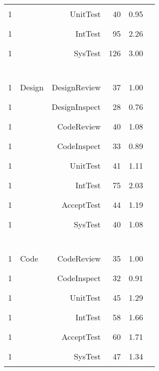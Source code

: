 \begin{tabular}{c|lr|r|rl}
1 &          &   UnitTest          & 40 &   0.95 & \textcolor{black}{\rule{9mm}{2mm}}\\
1 &          &   IntTest          & 95 &      2.26 & \textcolor{black}{\rule{22mm}{2mm}}\\
1 &          &   SysTest          & 126 &    3.00 & \textcolor{black}{\rule{30mm}{2mm}}\\
\hline\multicolumn{6}{c}{~}  \\
1 & Design   &   DesignReview     & 37 &   1.00 & \textcolor{black}{\rule{10mm}{2mm}}\\
1 &          &   DesignInspect    & 28 &    0.76 & \textcolor{black}{\rule{7mm}{2mm}}\\
1 &   &   CodeReview        & 40 &     1.08 & \textcolor{black}{\rule{10mm}{2mm}}\\
1 &   &   CodeInspect      & 33 &     0.89 & \textcolor{black}{\rule{8mm}{2mm}}\\
1 &   &   UnitTest          & 41 &     1.11 & \textcolor{black}{\rule{12mm}{2mm}}\\
1 &   &   IntTest          & 75 &    2.03 & \textcolor{black}{\rule{20mm}{2mm}}\\
1 &   &   AcceptTest       & 44 &     1.19 & \textcolor{black}{\rule{12mm}{2mm}}\\
1 &   &   SysTest           & 40 &     1.08 & \textcolor{black}{\rule{10mm}{2mm}}\\
\hline\multicolumn{6}{c}{~}  \\
1 &  Code   &   CodeReview      & 35    & 1.00 & \textcolor{black}{\rule{10mm}{2mm}}\\
1 &    &   CodeInspect    & 32   & 0.91 & \textcolor{black}{\rule{9mm}{2mm}}\\
1 &   &   UnitTest      & 45  & 1.29 & \textcolor{black}{\rule{12mm}{2mm}}\\
1 &    &   IntTest         & 58   & 1.66 & \textcolor{black}{\rule{16mm}{2mm}}\\
1 &    &   AcceptTest      & 60 &   1.71 & \textcolor{black}{\rule{17mm}{2mm}}\\
1 &   &   SysTest        & 47 &    1.34 & \textcolor{black}{\rule{13mm}{2mm}}\\

\end{tabular}
